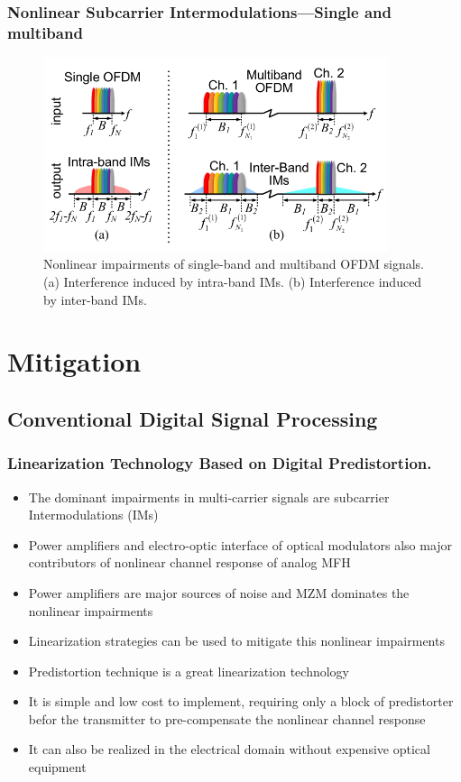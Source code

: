 \documentclass[t]{beamer}
\begin{document}
\begin{frame}
    \frametitle{Nonlinear Subcarrier Intermodulations---Single and multiband \cite{Wang2017}}
    \begin{figure}[h]
        \includegraphics[width=0.9\textwidth]{single-and-multiband-IM.PNG}
        \caption{Nonlinear impairments of single-band and multiband OFDM signals. (a) Interference induced by intra-band IMs. (b) Interference induced by inter-band IMs.}
        
    \end{figure}
    
\end{frame}

\section{Mitigation}
\subsection{Conventional Digital Signal Processing}

\begin{frame}
    \frametitle{Linearization Technology Based on Digital Predistortion.}
    \begin{itemize}
        \item The dominant impairments in multi-carrier signals are subcarrier Intermodulations (IMs)
        \item Power amplifiers and electro-optic interface of optical modulators also major contributors of nonlinear channel response of analog MFH
        \item Power amplifiers are major sources of noise and MZM dominates the nonlinear impairments
        \item Linearization strategies can be used to mitigate this nonlinear impairments
        \item Predistortion technique is a great linearization technology 
        \item It is simple and low cost to implement, requiring only a block of predistorter befor the transmitter to pre-compensate the nonlinear channel response
        \item It can also be realized in the electrical domain without expensive optical equipment
    \end{itemize}
\end{frame}
\end{document}
